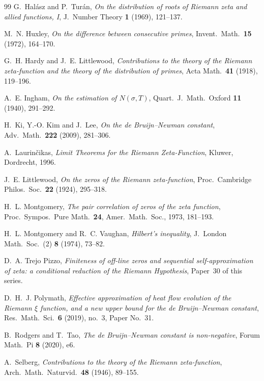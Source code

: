 \documentclass[11pt]{amsart}
\theoremstyle{plain}
\theoremstyle{definition}
\theoremstyle{remark}
\begin{document}
\begin{thebibliography}{99}
G.~Hal\'asz and P.~Tur\'an, \emph{On the distribution of roots of Riemann zeta and allied functions, I}, J.~Number Theory \textbf{1} (1969), 121--137.

M.~N. Huxley, \emph{On the difference between consecutive primes}, Invent.\ Math.\ \textbf{15} (1972), 164--170.

G.~H. Hardy and J.~E. Littlewood, \emph{Contributions to the theory of the Riemann zeta-function and the theory of the distribution of primes}, Acta Math.\ \textbf{41} (1918), 119--196.

A.~E. Ingham, \emph{On the estimation of $N(\sigma,T)$}, Quart.\ J.~Math.\ Oxford \textbf{11} (1940), 291--292.

H.~Ki, Y.-O. Kim and J.~Lee, \emph{On the de Bruijn--Newman constant}, Adv.\ Math.\ \textbf{222} (2009), 281--306.

A.~Laurin\v cikas, \emph{Limit Theorems for the Riemann Zeta-Function}, Kluwer, Dordrecht, 1996.

J.~E. Littlewood, \emph{On the zeros of the Riemann zeta-function}, Proc.\ Cambridge Philos.\ Soc.\ \textbf{22} (1924), 295--318.

H.~L. Montgomery, \emph{The pair correlation of zeros of the zeta function}, Proc.\ Sympos.\ Pure Math.\ \textbf{24}, Amer.\ Math.\ Soc., 1973, 181--193.

H.~L. Montgomery and R.~C. Vaughan, \emph{Hilbert's inequality}, J.~London Math.\ Soc.\ (2) \textbf{8} (1974), 73--82.

D.~A. Trejo Pizzo, \emph{Finiteness of off-line zeros and sequential self-approximation of zeta: a conditional reduction of the Riemann Hypothesis}, Paper~30 of this series.

D.~H.~J. Polymath, \emph{Effective approximation of heat flow evolution of the Riemann $\xi$ function, and a new upper bound for the de Bruijn--Newman constant}, Res.\ Math.\ Sci.\ \textbf{6} (2019), no.~3, Paper No.~31.

B.~Rodgers and T.~Tao, \emph{The de Bruijn--Newman constant is non-negative}, Forum Math.\ Pi \textbf{8} (2020), e6.

A.~Selberg, \emph{Contributions to the theory of the Riemann zeta-function}, Arch.\ Math.\ Naturvid.\ \textbf{48} (1946), 89--155.


\end{thebibliography}
\end{document}
